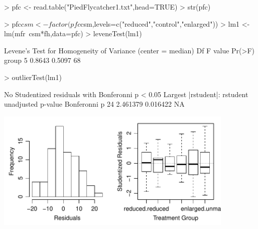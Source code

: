 \documentclass[a4paper]{article}
\begin{document}
\begin{Schunk}
\begin{Sinput}
> pfc <- read.table("PiedFlycatcher1.txt",head=TRUE)
> str(pfc)
\end{Sinput}
\begin{Sinput}
> pfc$csm <- factor(pfc$csm,levels=c("reduced","control","enlarged"))
> lm1 <- lm(mfr~csm*fh,data=pfc)
> leveneTest(lm1)
\end{Sinput}
\begin{Soutput}
Levene's Test for Homogeneity of Variance (center = median)
      Df F value Pr(>F)
group  5  0.8643 0.5097
      68               
\end{Soutput}
\begin{Sinput}
> outlierTest(lm1)
\end{Sinput}
\begin{Soutput}
No Studentized residuals with Bonferonni p < 0.05
Largest |rstudent|:
   rstudent unadjusted p-value Bonferonni p
24 2.461379           0.016422           NA
\end{Soutput}
\end{Schunk}
\includegraphics[width=4.5in]{Figs/q2-untrResids.PDF}
\end{document}
